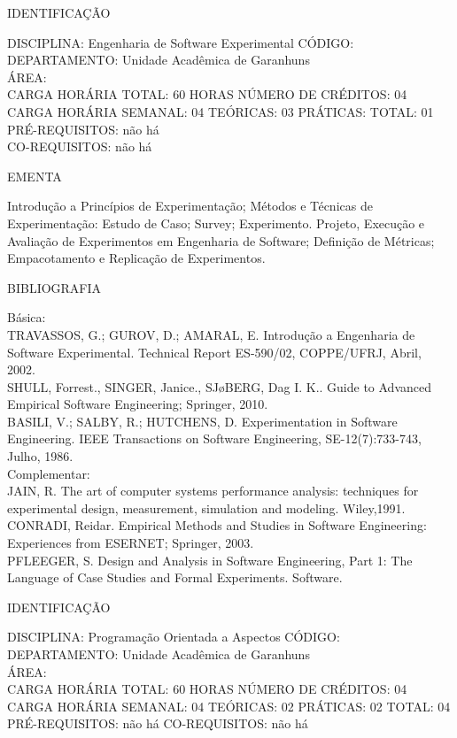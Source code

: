 \documentclass[
	12pt,				%
	openright,			%
  oneside,     %
	a4paper,			%
	english,			%
	french,				%
	spanish,			%
	brazil				%
	]{abntex2}
\begin{document}
\begin{apendicesenv}
IDENTIFICAÇÃO

DISCIPLINA: Engenharia de Software Experimental CÓDIGO:\\ 
DEPARTAMENTO: Unidade Acadêmica de Garanhuns\\
ÁREA: \\
CARGA HORÁRIA TOTAL: 60 HORAS NÚMERO DE CRÉDITOS: 04\\
CARGA HORÁRIA SEMANAL: 04 TEÓRICAS: 03 PRÁTICAS: TOTAL: 01\\
PRÉ-REQUISITOS: não há\\
CO-REQUISITOS: não há

EMENTA 

Introdução a Princípios de Experimentação; Métodos e Técnicas de
Experimentação: Estudo de Caso; Survey; Experimento. Projeto, Execução
e Avaliação de Experimentos em Engenharia de Software; Definição de
Métricas; Empacotamento e Replicação de Experimentos.

BIBLIOGRAFIA 

Básica:\\
TRAVASSOS, G.; GUROV, D.; AMARAL, E. Introdução a Engenharia de Software
Experimental. Technical Report ES-590/02, COPPE/UFRJ, Abril, 2002.\\
SHULL, Forrest., SINGER, Janice., SJøBERG, Dag I. K.. Guide to Advanced
Empirical Software Engineering; Springer, 2010.\\
BASILI, V.; SALBY, R.; HUTCHENS, D. Experimentation in Software
Engineering. IEEE Transactions on Software Engineering,
SE-12(7):733-743, Julho, 1986.\\
Complementar:\\
JAIN, R. The art of computer systems performance analysis: techniques
for experimental design, measurement, simulation and modeling.
Wiley,1991.\\
CONRADI, Reidar. Empirical Methods and Studies in Software Engineering:
Experiences from ESERNET; Springer, 2003.\\
PFLEEGER, S. Design and Analysis in Software Engineering, Part 1: The
Language of Case Studies and Formal Experiments. Software.

\newpage IDENTIFICAÇÃO

DISCIPLINA: Programação Orientada a Aspectos CÓDIGO:\\ 
DEPARTAMENTO: Unidade Acadêmica de Garanhuns\\ ÁREA: \\
CARGA HORÁRIA TOTAL: 60 HORAS NÚMERO DE CRÉDITOS: 04\\
CARGA HORÁRIA SEMANAL: 04 TEÓRICAS: 02 PRÁTICAS: 02 TOTAL: 04\\
PRÉ-REQUISITOS: não há
CO-REQUISITOS: não há


\end{apendicesenv}
\end{document}
